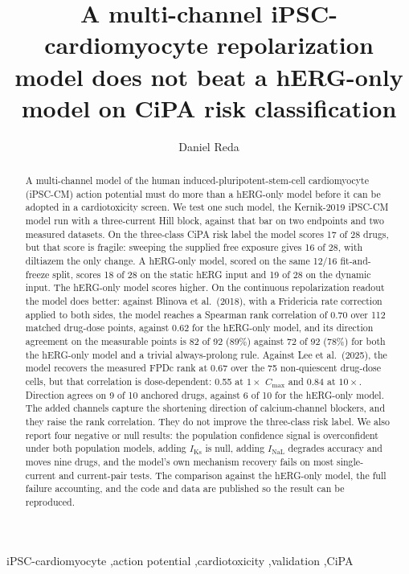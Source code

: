 \documentclass[preprint,12pt]{elsarticle}
\begin{document}
\begin{frontmatter}

\title{A multi-channel iPSC-cardiomyocyte repolarization model does not beat a
hERG-only model on CiPA risk classification}

\author[perturb]{Daniel Reda}

\begin{abstract}
A multi-channel model of the human induced-pluripotent-stem-cell cardiomyocyte
(iPSC-CM) action potential must do more than a hERG-only model
before it can be adopted in a cardiotoxicity screen. We test one such model, the
Kernik-2019 iPSC-CM model run with a three-current Hill block, against that bar on two
endpoints and two measured datasets. On the three-class CiPA risk label the model scores
17 of 28 drugs, but that score is fragile: sweeping the supplied free exposure gives 16
of 28, with diltiazem the only change. A
hERG-only model, scored on the same 12/16 fit-and-freeze
split, scores 18 of 28 on the static hERG input and 19 of 28 on the dynamic input. The
hERG-only model scores higher. On the continuous repolarization readout the model does
better: against Blinova et al.\ (2018), with a Fridericia rate correction applied to
both sides, the model reaches a Spearman rank correlation of 0.70 over 112 matched
drug-dose points, against 0.62 for the hERG-only model, and its direction agreement on the
measurable points is 82 of 92 (89\%) against 72 of 92 (78\%) for both the hERG-only model and a
trivial always-prolong rule. Against Lee et al.\ (2025), the model recovers the measured
FPDc rank at 0.67 over the 75 non-quiescent drug-dose cells, but that correlation is
dose-dependent: 0.55 at $1\times$ $C_{\mathrm{max}}$ and 0.84 at $10\times$. Direction
agrees on 9 of 10 anchored drugs, against 6 of 10 for the hERG-only model. The added channels
capture the shortening direction of calcium-channel blockers, and they raise the rank
correlation. They do not improve the three-class risk label. We also report four negative or null results: the
population confidence signal is overconfident under both population models, adding
$I_{\mathrm{Ks}}$ is null, adding $I_{\mathrm{NaL}}$ degrades accuracy and moves nine
drugs, and the model's own mechanism recovery fails on most single-current and current-pair
tests.
The comparison against the hERG-only model, the full failure accounting, and the code and data are published
so the result can be reproduced.
\end{abstract}

\begin{keyword}
iPSC-cardiomyocyte \sep action potential \sep cardiotoxicity \sep validation \sep CiPA
\end{keyword}

\end{frontmatter}
\end{document}

